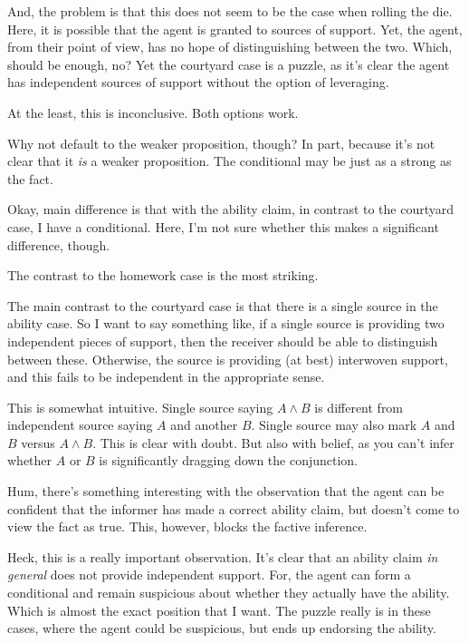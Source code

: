 \documentclass[10pt]{article}
\begin{document}
\begin{note}
  And, the problem is that this does not seem to be the case when rolling the die.
  Here, it is possible that the agent is granted to sources of support.
  Yet, the agent, from their point of view, has no hope of distinguishing between the two.
  Which, should be enough, no?
  Yet the courtyard case is a puzzle, as it's clear the agent has independent sources of support without the option of leveraging.

  At the least, this is inconclusive.
  Both options work.

  Why not default to the weaker proposition, though?
  In part, because it's not clear that it \emph{is} a weaker proposition.
  The conditional may be just as a strong as the fact.

  Okay, main difference is that with the ability claim, in contrast to the courtyard case, I have a conditional.
  Here, I'm not sure whether this makes a significant difference, though.

  The contrast to the homework case is the most striking.

  The main contrast to the courtyard case is that there is a single source in the ability case.
  So I want to say something like, if a single source is providing two independent pieces of support, then the receiver should be able to distinguish between these.
  Otherwise, the source is providing (at best) interwoven support, and this fails to be independent in the appropriate sense.

  This is somewhat intuitive.
  Single source saying \(A \land B\) is different from independent source saying \(A\) and another \(B\).
  Single source may also mark \(A\) and \(B\) versus \(A \land B\).
  This is clear with doubt.
  But also with belief, as you can't infer whether \(A\) or \(B\) is significantly dragging down the conjunction.

  Hum, there's something interesting with the observation that the agent can be confident that the informer has made a correct ability claim, but doesn't come to view the fact as true.
  This, however, blocks the factive inference.

  Heck, this is a really important observation.
  It's clear that an ability claim \emph{in general} does not provide independent support.
  For, the agent can form a conditional and remain suspicious about whether they actually have the ability.
  Which is almost the exact position that I want.
  The puzzle really is in these cases, where the agent could be suspicious, but ends up endorsing the ability.
\end{note}
\end{document}
